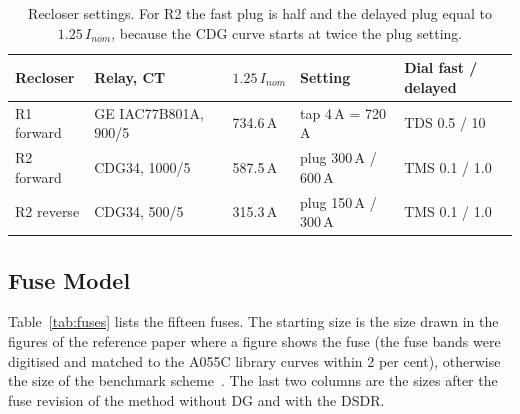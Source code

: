 \documentclass[12pt,a4paper]{article}
\begin{document}
\begin{table}[H]
\centering\small
\begin{tabularx}{\textwidth}{|l|L|l|l|l|}
\hline
\textbf{Recloser} & \textbf{Relay, CT} & \textbf{$1.25\,I_{nom}$} & \textbf{Setting} & \textbf{Dial fast / delayed} \\ \hline
R1 forward & GE IAC77B801A, 900/5 & 734.6\,A & tap 4\,A = 720\,A & TDS 0.5 / 10 \\ \hline
R2 forward & CDG34, 1000/5 & 587.5\,A & plug 300\,A / 600\,A & TMS 0.1 / 1.0 \\ \hline
R2 reverse & CDG34, 500/5 & 315.3\,A & plug 150\,A / 300\,A & TMS 0.1 / 1.0 \\ \hline
\end{tabularx}
\caption{Recloser settings. For R2 the fast plug is half and the delayed plug equal to $1.25\,I_{nom}$, because
the CDG curve starts at twice the plug setting.}
\label{tab:settings}
\end{table}

\subsection{Fuse Model}
Table~\ref{tab:fuses} lists the fifteen fuses. The starting size is the size drawn in the figures of the
reference paper where a figure shows the fuse (the fuse bands were digitised and matched to the A055C
library curves within 2 per cent), otherwise the size of the benchmark scheme~\cite{yousaf2020}. The last two
columns are the sizes after the fuse revision of the method without DG and with the DSDR.
\end{document}
